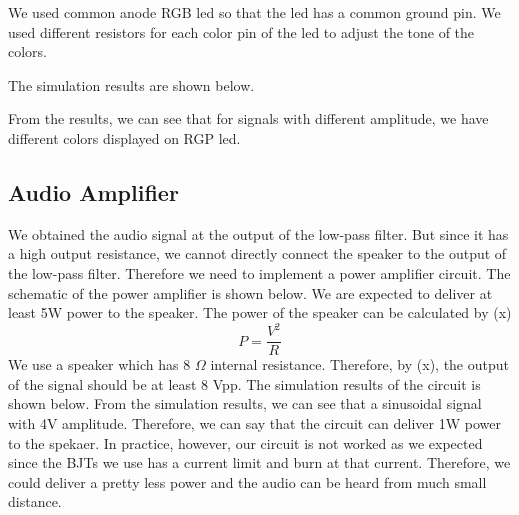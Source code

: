 \documentclass[conference]{IEEEtran}
\begin{document}
\par We used common anode RGB led so that the led has a common ground pin. We used different resistors for each color pin of the led 
to adjust the tone of the colors. 

\par The simulation results are shown below.
\par From the results, we can see that for signals with different amplitude, we have different colors displayed on RGP led.

\subsection{Audio Amplifier}
We obtained the audio signal at the output of the low-pass filter. But since it has a high output resistance, we cannot directly connect 
the speaker to the output of the low-pass filter. Therefore we need to implement a power amplifier circuit. The schematic of the power 
amplifier is shown below. 
We are expected to deliver at least 5W power to the speaker. The power of the speaker can be calculated by (x)
\begin{equation}
    P = \frac{V^2}{R}
\end{equation}
We use a speaker which has 8 \(\Omega\) internal resistance. Therefore, by (x), the output of the signal should be at least 8 Vpp. The 
simulation results of the circuit is shown below. 
From the simulation results, we can see that a sinusoidal signal with 4V amplitude. Therefore, we can say that the circuit can deliver 
1W power to the spekaer. In practice, however, our circuit is not worked as we expected since the BJTs we use has a current limit and burn 
at that current. Therefore, we could deliver a pretty less power and the audio can be heard from much small distance. 
\end{document}
